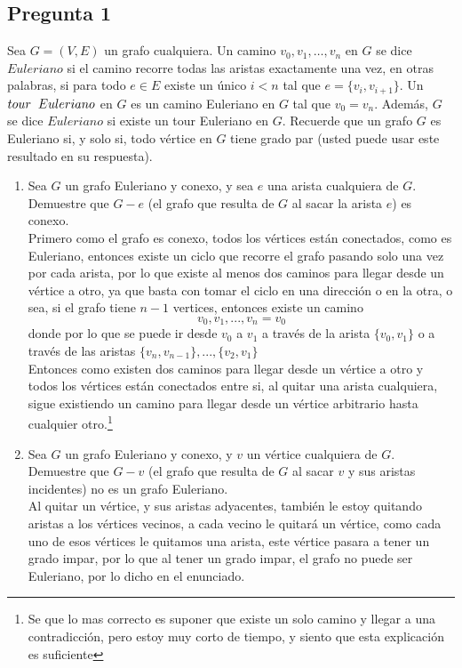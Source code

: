 \documentclass[letter]{article}
\begin{document}
	\begin{pregunta}{1}
	
		\section*{Pregunta 1}
		Sea $G = (V,E)$ un grafo cualquiera. Un camino $v_0,v_1,\ldots,v_n$ en $G$ se dice $Euleriano$ si el camino recorre todas las aristas exactamente una vez, en otras palabras, si para todo $e\in E$ existe un único $i<n$ tal que $e=\{v_i, v_{i+1}\}$. Un $tour\hspace*{2mm}Euleriano$ en $G$ es un camino Euleriano en $G$ tal que $v_0=v_n$. Además, $G$ se dice $Euleriano$ si existe un tour Euleriano en $G$. Recuerde que un grafo $G$ es Euleriano si, y solo si, todo vértice en $G$ tiene grado par (usted puede usar este resultado en su respuesta).
		\begin{enumerate}
		\item Sea $G$ un grafo Euleriano y conexo, y sea $e$ una arista cualquiera de $G$. Demuestre que $G- e$ (el grafo que resulta de $G$ al sacar la arista $e$) es conexo.\\
		
		Primero como el grafo es conexo, todos los vértices están conectados, como es Euleriano, entonces existe un ciclo que recorre el grafo pasando solo una vez por cada arista, por lo que existe al menos dos caminos para llegar desde un vértice a otro, ya que basta con tomar el ciclo en una dirección o en la otra, o sea, si el grafo tiene $n-1$ vertices, entonces existe un camino
	\begin{equation*}
	v_0, v_1, ...,v_n=v_0
	\end{equation*}
		donde por lo que se puede ir desde $v_0$ a $v_1$ a través de la arista $\{v_0, v_1\}$ o a través de las aristas $\{v_n, v_{n-1}\}, ..., \{v_2, v_1\}$\\
		Entonces como existen dos caminos para llegar desde un vértice a otro y todos los vértices están conectados entre si, al quitar una arista cualquiera, sigue existiendo un camino para llegar desde un vértice arbitrario hasta cualquier otro.\footnote{Se que lo mas correcto es suponer que existe un solo camino y llegar a una contradicción, pero estoy muy corto de tiempo, y siento que esta explicación es suficiente}
		\item Sea $G$ un grafo Euleriano y conexo, y $v$ un vértice cualquiera de $G$. Demuestre que $G-v$ (el grafo que resulta de $G$ al sacar $v$ y sus aristas incidentes) no es un grafo Euleriano.\\
		Al quitar un vértice, y sus aristas adyacentes, también le estoy quitando aristas a los vértices vecinos, a cada vecino le quitará un vértice, como cada uno de esos vértices le quitamos una arista, este vértice pasara a tener un grado impar, por lo que al tener un grado impar, el grafo no puede ser Euleriano, por lo dicho en el enunciado.
		\end{enumerate}
		
			
	\end{pregunta}
\end{document}
